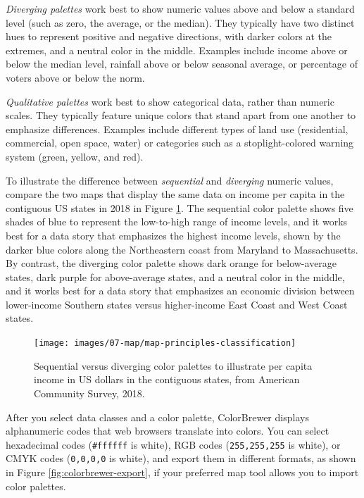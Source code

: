 \documentclass[
  english,
]{book}
\begin{document}
\emph{Diverging palettes} work best to show numeric values above and below a standard level (such as zero, the average, or the median). They typically have two distinct hues to represent positive and negative directions, with darker colors at the extremes, and a neutral color in the middle. Examples include income above or below the median level, rainfall above or below seasonal average, or percentage of voters above or below the norm.

\emph{Qualitative palettes} work best to show categorical data, rather than numeric scales. They typically feature unique colors that stand apart from one another to emphasize differences. Examples include different types of land use (residential, commercial, open space, water) or categories such as a stoplight-colored warning system (green, yellow, and red).

To illustrate the difference between \emph{sequential} and \emph{diverging} numeric values, compare the two maps that display the same data on income per capita in the contiguous US states in 2018 in Figure \ref{fig:map-principles-classification}. The sequential color palette shows five shades of blue to represent the low-to-high range of income levels, and it works best for a data story that emphasizes the highest income levels, shown by the darker blue colors along the Northeastern coast from Maryland to Massachusetts. By contrast, the diverging color palette shows dark orange for below-average states, dark purple for above-average states, and a neutral color in the middle, and it works best for a data story that emphasizes an economic division between lower-income Southern states versus higher-income East Coast and West Coast states.



\begin{figure}
\texttt{[image: images/07-map/map-principles-classification]} \caption{Sequential versus diverging color palettes to illustrate per capita income in US dollars in the contiguous states, from American Community Survey, 2018.}\label{fig:map-principles-classification}
\end{figure}

After you select data classes and a color palette, ColorBrewer displays alphanumeric codes that web browsers translate into colors. You can select hexadecimal codes (\texttt{\#ffffff} is white), RGB codes (\texttt{255,255,255} is white), or CMYK codes (\texttt{0,0,0,0} is white), and export them in different formats, as shown in Figure \ref{fig:colorbrewer-export}, if your preferred map tool allows you to import color palettes.
\end{document}

